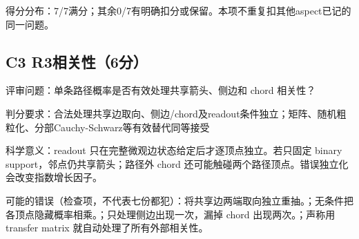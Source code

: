 \documentclass[11pt,a4paper]{article}
\begin{document}
得分分布：7/7满分；其余0/7有明确扣分或保留。本项不重复扣其他aspect已记的同一问题。

\clearpage
\subsection{C3 R3相关性（6分）}
\label{aspect:C3}
评审问题：单条路径概率是否有效处理共享箭头、侧边和 chord 相关性？

判分要求：合法处理共享边取向、侧边/chord及readout条件独立；矩阵、随机粗粒化、分部Cauchy-Schwarz等有效替代同等接受

科学意义：readout 只在完整微观边状态给定后才逐顶点独立。若只固定 binary support，邻点仍共享箭头；路径外 chord 还可能触碰两个路径顶点。错误独立化会改变指数增长因子。

可能的错误（检查项，不代表七份都犯）：将共享边两端取向独立重抽。；无条件把各顶点隐藏概率相乘。；只处理侧边出现一次，漏掉 chord 出现两次。；声称用 transfer matrix 就自动处理了所有外部相关性。
\end{document}

